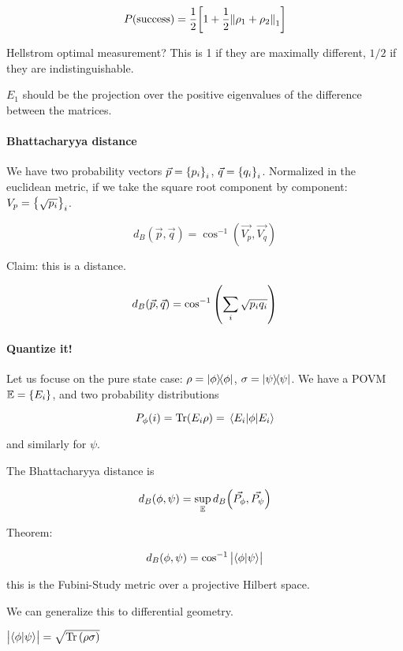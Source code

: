 \begin{equation}
  P(\text{success}) = \frac{1}{2}\qty[1 + \frac{1}{2} \norm{\rho_1 + \rho_2}_1]
\end{equation}

Hellstrom optimal measurement?
This is 1 if they are maximally different, $1/2$ if they are indistinguishable.

$E_1$ should be the projection over the positive eigenvalues of the difference between the matrices.

\paragraph{Bhattacharyya distance}

We have two probability vectors \(\vec{p} = \qty{p_i}_i\), \(\vec{q} = \qty{q_i}_i\).
Normalized in the euclidean metric, if we take the square root component by component: \(V_p = \qty{\sqrt{p_i}}_i\).

\begin{equation}
  d_B (\vec{p}, \vec{q}) = \cos^{-1} (\vec{V_p}, \vec{V_q})
\end{equation}

Claim: this is a distance.

\begin{equation}
  d_B (\vec{p}, \vec{q}) = \cos^{-1} \qty(\sum_i \sqrt{p_i q_i})
\end{equation}


\paragraph{Quantize it!}

Let us focuse on the pure state case: \(\rho = \ketbra{\phi}\), \(\sigma = \ketbra{\psi}\).
We have a POVM \(\mathbb{E} = \qty{E_i}\), and two probability distributions

\begin{equation}
  P_\phi (i) = \Tr (E_i \rho) = \ev{\phi}{E_i}
\end{equation}

and similarly for \(\psi\).

The Bhattacharyya distance is

\begin{equation}
  d_B (\phi, \psi) = \sup _\mathbb{E} d_B\qty(\vec{P_\phi}, \vec{P_\psi})
\end{equation}

Theorem:

\begin{equation}
  d_B (\phi, \psi) = \cos^{-1} \abs{\braket{\phi}{\psi}}
\end{equation}

this is the Fubini-Study metric over a projective Hilbert space.

We can generalize this to differential geometry.

\(\abs{\braket{\phi}{\psi}} = \sqrt{\Tr \qty(\rho\sigma)}\)
